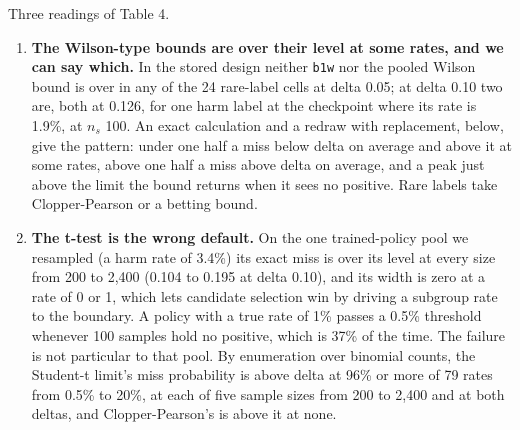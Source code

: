 \documentclass[11pt]{article}
\begin{document}
Three readings of Table 4.


\begin{enumerate}
\item \textbf{The Wilson-type bounds are over their level at some rates, and we can say which.} In the stored design neither \texttt{b1w} nor the pooled Wilson bound is over in any of the 24 rare-label cells at delta 0.05; at delta 0.10 two are, both at 0.126, for one harm label at the checkpoint where its rate is 1.9\%, at $n_{s}$ 100. An exact calculation and a redraw with replacement, below, give the pattern: under one half a miss below delta on average and above it at some rates, above one half a miss above delta on average, and a peak just above the limit the bound returns when it sees no positive. Rare labels take Clopper-Pearson or a betting bound.
\item \textbf{The t-test is the wrong default.} On the one trained-policy pool we resampled (a harm rate of 3.4\%) its exact miss is over its level at every size from 200 to 2,400 (0.104 to 0.195 at delta 0.10), and its width is zero at a rate of 0 or 1, which lets candidate selection win by driving a subgroup rate to the boundary. A policy with a true rate of 1\% passes a 0.5\% threshold whenever 100 samples hold no positive, which is 37\% of the time. The failure is not particular to that pool. By enumeration over binomial counts, the Student-t limit's miss probability is above delta at 96\% or more of 79 rates from 0.5\% to 20\%, at each of five sample sizes from 200 to 2,400 and at both deltas, and Clopper-Pearson's is above it at none.

\end{enumerate}
\end{document}
